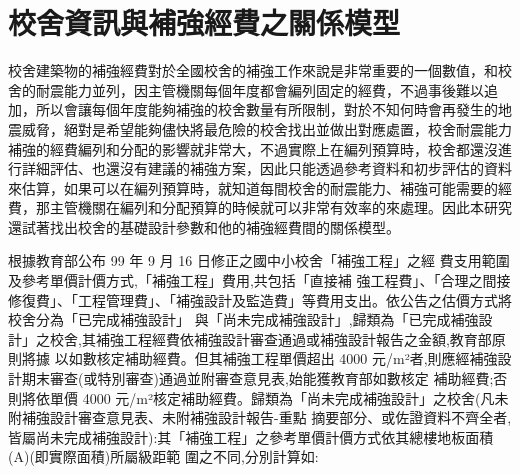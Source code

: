 \renewcommand\thetable{\arabic{chapter}-\arabic{table}}
\chapter{校舍資訊與補強經費之關係模型}

校舍建築物的補強經費對於全國校舍的補強工作來說是非常重要的一個數值，和校舍的耐震能力並列，因主管機關每個年度都會編列固定的經費，不過事後難以追加，所以會讓每個年度能夠補強的校舍數量有所限制，對於不知何時會再發生的地震威脅，絕對是希望能夠儘快將最危險的校舍找出並做出對應處置，校舍耐震能力補強的經費編列和分配的影響就非常大，不過實際上在編列預算時，校舍都還沒進行詳細評估、也還沒有建議的補強方案，因此只能透過參考資料和初步評估的資料來估算，如果可以在編列預算時，就知道每間校舍的耐震能力、補強可能需要的經費，那主管機關在編列和分配預算的時候就可以非常有效率的來處理。因此本研究還試著找出校舍的基礎設計參數和他的補強經費間的關係模型。

根據教育部公布 99 年 9 月 16 日修正之國中小校舍「補強工程」之經 費支用範圍及參考單價計價方式,「補強工程」費用,共包括「直接補 強工程費」、「合理之間接修復費」、「工程管理費」、「補強設計及監造費」等費用支出。依公告之估價方式將校舍分為「已完成補強設計」 與「尚未完成補強設計」,歸類為「已完成補強設計」之校舍,其補強工程經費依補強設計審查通過或補強設計報告之金額,教育部原則將據 以如數核定補助經費。但其補強工程單價超出 4000 元/m²者,則應經補強設計期末審查(或特別審查)通過並附審查意見表,始能獲教育部如數核定 補助經費;否則將依單價 4000 元/m²核定補助經費。歸類為「尚未完成補強設計」之校舍(凡未附補強設計審查意見表、未附補強設計報告-重點 摘要部分、或佐證資料不齊全者,皆屬尚未完成補強設計):其「補強工程」之參考單價計價方式依其總樓地板面積(A)(即實際面積)所屬級距範 圍之不同,分別計算如:

